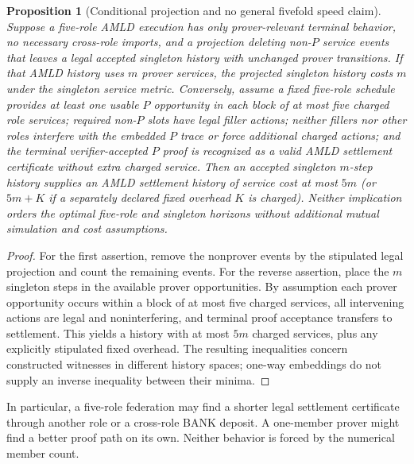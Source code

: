 \documentclass[11pt]{article}
\newtheorem{proposition}[theorem]{Proposition}
\theoremstyle{definition}
\begin{document}
\begin{proposition}[Conditional projection and no general fivefold speed claim]\label{prop:projection}
Suppose a five-role AMLD execution has only prover-relevant terminal behavior, no necessary cross-role imports, and a projection deleting non-$P$ service events that leaves a legal accepted singleton history with unchanged prover transitions. If that AMLD history uses $m$ prover services, the projected singleton history costs $m$ under the singleton service metric. Conversely, assume a fixed five-role schedule provides at least one usable $P$ opportunity in each block of at most five charged role services; required non-$P$ slots have legal filler actions; neither fillers nor other roles interfere with the embedded $P$ trace or force additional charged actions; and the terminal verifier-accepted $P$ proof is recognized as a valid AMLD settlement certificate without extra charged service. Then an accepted singleton $m$-step history supplies an AMLD settlement history of service cost at most $5m$ (or $5m+K$ if a separately declared fixed overhead $K$ is charged). Neither implication orders the \emph{optimal} five-role and singleton horizons without additional mutual simulation and cost assumptions.
\end{proposition}
\begin{proof}
For the first assertion, remove the nonprover events by the stipulated legal projection and count the remaining events. For the reverse assertion, place the $m$ singleton steps in the available prover opportunities. By assumption each prover opportunity occurs within a block of at most five charged services, all intervening actions are legal and noninterfering, and terminal proof acceptance transfers to settlement. This yields a history with at most $5m$ charged services, plus any explicitly stipulated fixed overhead. The resulting inequalities concern constructed witnesses in different history spaces; one-way embeddings do not supply an inverse inequality between their minima.
\end{proof}

In particular, a five-role federation may find a shorter legal settlement certificate through another role or a cross-role BANK deposit. A one-member prover might find a better proof path on its own. Neither behavior is forced by the numerical member count.
\end{document}
